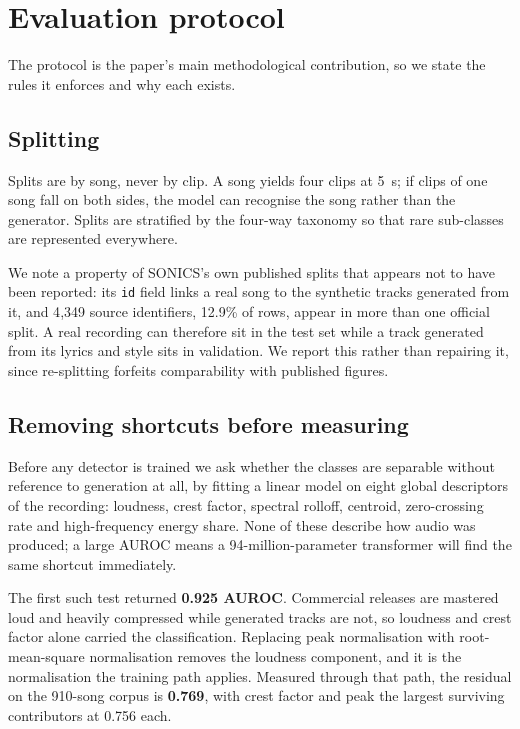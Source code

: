 \section{Evaluation protocol}
\label{sec:protocol}

The protocol is the paper's main methodological contribution, so we state the
rules it enforces and why each exists.

\subsection{Splitting}

Splits are by song, never by clip. A song yields four clips at \SI{5}{\second}; if clips
of one song fall on both sides, the model can recognise the song rather than the
generator. Splits are stratified by the four-way taxonomy so that rare
sub-classes are represented everywhere.

We note a property of SONICS's own published splits that appears not to have
been reported: its \texttt{id} field links a real song to the synthetic tracks
generated from it, and 4{,}349 source identifiers, 12.9\% of rows, appear in
more than one official split. A real recording can therefore sit in the test set
while a track generated from its lyrics and style sits in validation. We report
this rather than repairing it, since re-splitting forfeits comparability with
published figures.

\subsection{Removing shortcuts before measuring}

Before any detector is trained we ask whether the classes are separable without
reference to generation at all, by fitting a linear model on eight global
descriptors of the recording: loudness, crest factor, spectral rolloff,
centroid, zero-crossing rate and high-frequency energy share. None of these
describe how audio was produced; a large AUROC means a 94-million-parameter
transformer will find the same shortcut immediately.

The first such test returned \textbf{0.925 AUROC}. Commercial releases are
mastered loud and heavily compressed while generated tracks are not, so loudness
and crest factor alone carried the classification. Replacing peak normalisation
with root-mean-square normalisation removes the loudness component, and it is
the normalisation the training path applies. Measured through that path, the
residual on the 910-song corpus is \textbf{0.769}, with crest factor and peak
the largest surviving contributors at 0.756 each.

